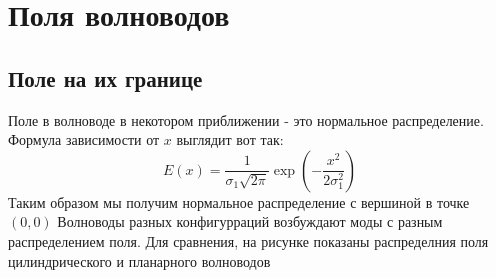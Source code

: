 \chapter{Поля волноводов}
\section{Поле на их границе}
Поле в волноводе в некотором приближении - это нормальное распределение. Формула зависимости от $x$
выглядит вот так:
\begin{equation}
  \label{gauss}
  E(x)=\frac{1}{\sigma_1\sqrt{2\pi}}\exp\left(-\frac{x^2}{2\sigma_1^2}\right)
\end{equation}
Таким образом мы получим нормальное распределение с вершиной в точке $(0,0)$
Волноводы разных конфигурраций возбуждают моды с разным распределением поля. Для сравнения, на рисунке показаны распределния поля цилиндрического и планарного волноводов

